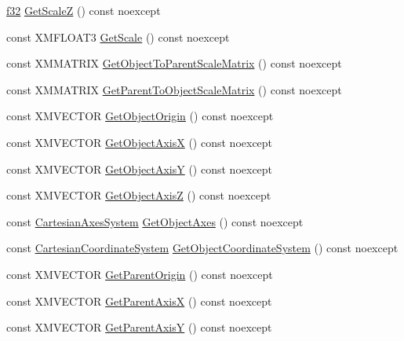 \begin{DoxyCompactItemize}
\item 
\hyperlink{namespacemage_a6a44ad388483959dc4dff9f2aef91431}{f32} \hyperlink{structmage_1_1_transform_node_a7277c0e070bd7923a593c9756f023a60}{Get\+ScaleZ} () const noexcept
\item 
const X\+M\+F\+L\+O\+A\+T3 \hyperlink{structmage_1_1_transform_node_a23109efb661cb17d3957286952334dc2}{Get\+Scale} () const noexcept
\item 
const X\+M\+M\+A\+T\+R\+IX \hyperlink{structmage_1_1_transform_node_a0abee6b9b77888cd5ca44060256a33c7}{Get\+Object\+To\+Parent\+Scale\+Matrix} () const noexcept
\item 
const X\+M\+M\+A\+T\+R\+IX \hyperlink{structmage_1_1_transform_node_adad8b644fdd549028bb86f97606e2798}{Get\+Parent\+To\+Object\+Scale\+Matrix} () const noexcept
\item 
const X\+M\+V\+E\+C\+T\+OR \hyperlink{structmage_1_1_transform_node_a5f97b639779c4b9d24e144f1d8c9da12}{Get\+Object\+Origin} () const noexcept
\item 
const X\+M\+V\+E\+C\+T\+OR \hyperlink{structmage_1_1_transform_node_a0e31d129c0a6524a612ce28db24f0600}{Get\+Object\+AxisX} () const noexcept
\item 
const X\+M\+V\+E\+C\+T\+OR \hyperlink{structmage_1_1_transform_node_ad595911b6df1898a49263eb8e201d00c}{Get\+Object\+AxisY} () const noexcept
\item 
const X\+M\+V\+E\+C\+T\+OR \hyperlink{structmage_1_1_transform_node_a12e14a4d519295d6d1fb2b839061ef20}{Get\+Object\+AxisZ} () const noexcept
\item 
const \hyperlink{structmage_1_1_cartesian_axes_system}{Cartesian\+Axes\+System} \hyperlink{structmage_1_1_transform_node_a3e6b79b7e1a0844d8f93acaecdf65346}{Get\+Object\+Axes} () const noexcept
\item 
const \hyperlink{structmage_1_1_cartesian_coordinate_system}{Cartesian\+Coordinate\+System} \hyperlink{structmage_1_1_transform_node_a59417bfb21810840f90cee6a192e6ffd}{Get\+Object\+Coordinate\+System} () const noexcept
\item 
const X\+M\+V\+E\+C\+T\+OR \hyperlink{structmage_1_1_transform_node_a22a853447eaf646db3522e7f4093ae01}{Get\+Parent\+Origin} () const noexcept
\item 
const X\+M\+V\+E\+C\+T\+OR \hyperlink{structmage_1_1_transform_node_ac562bb1036c0bc55c0ededd8fa956fda}{Get\+Parent\+AxisX} () const noexcept
\item 
const X\+M\+V\+E\+C\+T\+OR \hyperlink{structmage_1_1_transform_node_a5d5138bb149828fa78da166129f996b1}{Get\+Parent\+AxisY} () const noexcept

\end{DoxyCompactItemize}
